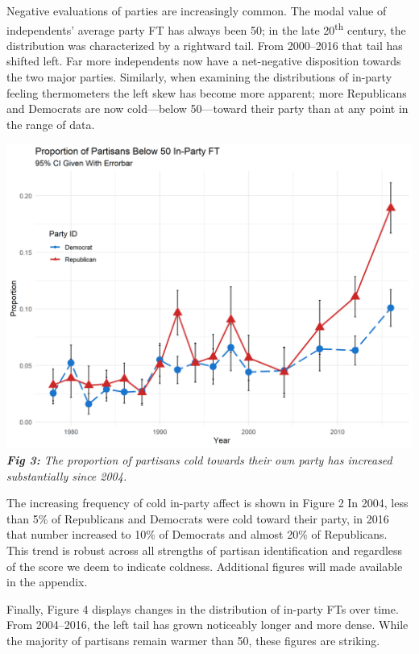 \documentclass[
  12,
]{paper}
\begin{document}
Negative evaluations of parties are increasingly common. The modal value
of independents' average party FT has always been 50; in the late
20\textsuperscript{th} century, the distribution was characterized by a
rightward tail. From 2000--2016 that tail has shifted left. Far more
independents now have a net-negative disposition towards the two major
parties. Similarly, when examining the distributions of in-party feeling
thermometers the left skew has become more apparent; more Republicans
and Democrats are now cold---below 50---toward their party than at any
point in the range of data.

\includegraphics{fig/gg-below-50-ns.png} \emph{\textbf{Fig 3:} The
proportion of partisans cold towards their own party has increased
substantially since 2004.}

The increasing frequency of cold in-party affect is shown in Figure 2 In
2004, less than 5\% of Republicans and Democrats were cold toward their
party, in 2016 that number increased to 10\% of Democrats and almost
20\% of Republicans. This trend is robust across all strengths of
partisan identification and regardless of the score we deem to indicate
coldness. Additional figures will made available in the appendix.

Finally, Figure 4 displays changes in the distribution of in-party FTs
over time. From 2004--2016, the left tail has grown noticeably longer
and more dense. While the majority of partisans remain warmer than 50,
these figures are striking.
\end{document}
